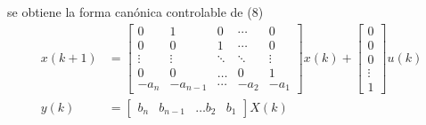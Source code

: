 se obtiene la forma canónica controlable de (8)
\[
    \begin{split}
        x(k+1) & = 
        \begin{bmatrix}
            0 & 1 & 0 & \cdots & 0 \\
            0 & 0 & 1 & \cdots & 0 \\
            \vdots & \vdots & \ddots & \ddots & \vdots \\
            0 & 0 & \ldots & 0 & 1 \\
            -a_{n} & -a_{n-1} & \cdots & -a_{2} & -a_{1}
        \end{bmatrix}x(k) +
        \begin{bmatrix}
            0 \\ 0 \\ 0 \\ \vdots \\ 1
        \end{bmatrix}u(k) \\
        y(k) & = 
        \begin{bmatrix}
            b_{n} & b_{n-1} & \ldots b_{2} & b_{1}    
        \end{bmatrix} X(k)
    \end{split}
\]